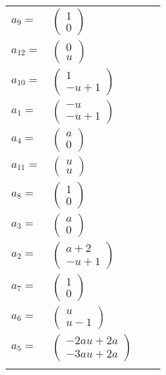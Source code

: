 \documentclass[1p]{elsarticle_modified}
\theoremstyle{definition}
\begin{document}
\begin{tabular}{m{7pt} m{180pt} m{7pt} m{180pt} }
\flushright $a_{9}=$&$\begin{pmatrix}1\\0\end{pmatrix}$ \\
\flushright $a_{12}=$&$\begin{pmatrix}0\\u\end{pmatrix}$ \\
\flushright $a_{10}=$&$\begin{pmatrix}1\\- u+1\end{pmatrix}$ \\
\flushright $a_{1}=$&$\begin{pmatrix}- u\\- u+1\end{pmatrix}$ \\
\flushright $a_{4}=$&$\begin{pmatrix}a\\0\end{pmatrix}$ \\
\flushright $a_{11}=$&$\begin{pmatrix}u\\u\end{pmatrix}$ \\
\flushright $a_{8}=$&$\begin{pmatrix}1\\0\end{pmatrix}$ \\
\flushright $a_{3}=$&$\begin{pmatrix}a\\0\end{pmatrix}$ \\
\flushright $a_{2}=$&$\begin{pmatrix}a+2\\- u+1\end{pmatrix}$ \\
\flushright $a_{7}=$&$\begin{pmatrix}1\\0\end{pmatrix}$ \\
\flushright $a_{6}=$&$\begin{pmatrix}u\\u-1\end{pmatrix}$ \\
\flushright $a_{5}=$&$\begin{pmatrix}-2 a u+2 a\\-3 a u+2 a\end{pmatrix}$\\&\end{tabular}
\end{document}
